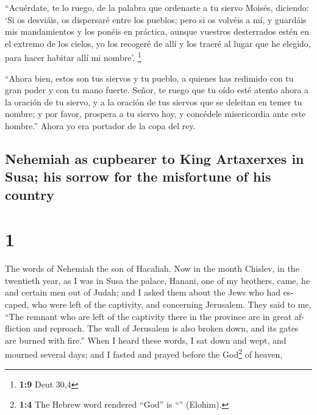\begin{paracol}{2}
 ``Acuérdate, te lo ruego, de la palabra que ordenaste a
tu siervo Moisés, diciendo: `Si os desviáis, os dispersaré entre los
pueblos;  pero si os volvéis a mí, y guardáis mis
mandamientos y los ponéis en práctica, aunque vuestros desterrados estén
en el extremo de los cielos, yo los recogeré de allí y los traeré al
lugar que he elegido, para hacer habitar allí mi nombre'. \footnote{\textbf{1:9}
  Deut 30,4}

 ``Ahora bien, estos son tus siervos y tu pueblo, a
quienes has redimido con tu gran poder y con tu mano fuerte.
 Señor, te ruego que tu oído esté atento ahora a la
oración de tu siervo, y a la oración de tus siervos que se deleitan en
temer tu nombre; y por favor, prospera a tu siervo hoy, y concédele
misericordia ante este hombre.'' Ahora yo era portador de la copa del
rey.

\switchcolumn
\begin{otherlanguage}{english}

\hypertarget{nehemiah-as-cupbearer-to-king-artaxerxes-in-susa-his-sorrow-for-the-misfortune-of-his-country}{%
\subsection{Nehemiah as cupbearer to King Artaxerxes in Susa; his sorrow
for the misfortune of his
country}\label{nehemiah-as-cupbearer-to-king-artaxerxes-in-susa-his-sorrow-for-the-misfortune-of-his-country}}

\hypertarget{section-1}{%
\section{1}\label{section-1}}

 The words of Nehemiah the son of Hacaliah. Now in the
month Chislev, in the twentieth year, as I was in Susa the palace,
 Hanani, one of my brothers, came, he and certain men out
of Judah; and I asked them about the Jews who had escaped, who were left
of the captivity, and concerning Jerusalem.  They said to
me, ``The remnant who are left of the captivity there in the province
are in great affliction and reproach. The wall of Jerusalem is also
broken down, and its gates are burned with fire.''  When I
heard these words, I sat down and wept, and mourned several days; and I
fasted and prayed before the God\footnote{\textbf{1:4} The Hebrew word
  rendered ``God'' is ``'' (Elohim).} of heaven,


\end{otherlanguage}
\end{paracol}
